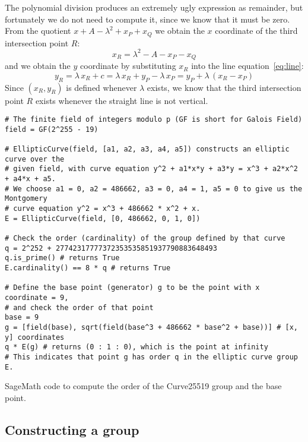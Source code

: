 \documentclass[manuscript]{acmart}
\begin{document}
The polynomial division produces an extremely ugly expression as remainder, but fortunately we do not need to compute it, since we know that it must be zero.
From the quotient $x + A - \lambda^2 + x_P + x_Q$ we obtain the $x$ coordinate of the third intersection point $R$:
\begin{equation}
x_R = \lambda^2 - A - x_P - x_Q \label{eq:xR}
\end{equation}
and we obtain the $y$ coordinate by substituting $x_R$ into the line equation~\eqref{eq:line}:
\begin{equation}
y_R = \lambda\,x_R + c = \lambda\,x_R + y_P - \lambda\,x_P = y_P + \lambda\,(x_R - x_P) \label{eq:yR}
\end{equation}
Since $(x_R, y_R)$ is defined whenever $\lambda$ exists, we know that the third intersection point $R$ exists whenever the straight line is not vertical.

\begin{listing}
\begin{verbatim}
# The finite field of integers modulo p (GF is short for Galois Field)
field = GF(2^255 - 19)

# EllipticCurve(field, [a1, a2, a3, a4, a5]) constructs an elliptic curve over the
# given field, with curve equation y^2 + a1*x*y + a3*y = x^3 + a2*x^2 + a4*x + a5.
# We choose a1 = 0, a2 = 486662, a3 = 0, a4 = 1, a5 = 0 to give us the Montgomery
# curve equation y^2 = x^3 + 486662 * x^2 + x.
E = EllipticCurve(field, [0, 486662, 0, 1, 0])

# Check the order (cardinality) of the group defined by that curve
q = 2^252 + 27742317777372353535851937790883648493
q.is_prime() # returns True
E.cardinality() == 8 * q # returns True

# Define the base point (generator) g to be the point with x coordinate = 9,
# and check the order of that point
base = 9
g = [field(base), sqrt(field(base^3 + 486662 * base^2 + base))] # [x, y] coordinates
q * E(g) # returns (0 : 1 : 0), which is the point at infinity
# This indicates that point g has order q in the elliptic curve group E.
\end{verbatim}
\caption{SageMath code to compute the order of the Curve25519 group and the base point.}\label{code:group-order}
\end{listing}

\subsection{Constructing a group}\label{sec:group-construction}
\end{document}
